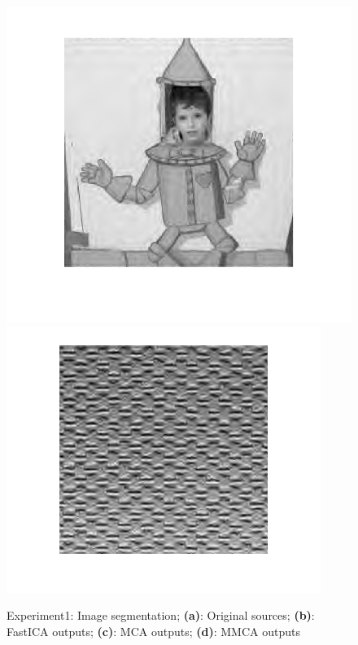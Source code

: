 \begin{figure}
{\begin{minipage}[b]{0.23\linewidth}
\includegraphics[width=1\linewidth]{images/mmca_cartoon.png}\vspace{4pt}
\includegraphics[width=1\linewidth]{images/mmca_texture.png}
\end{minipage}}

\caption{Experiment1: Image segmentation; \textbf{(a)}: Original sources; \textbf{(b)}: FastICA outputs; \textbf{(c)}: MCA outputs; \textbf{(d)}: MMCA outputs}
\end{figure}



